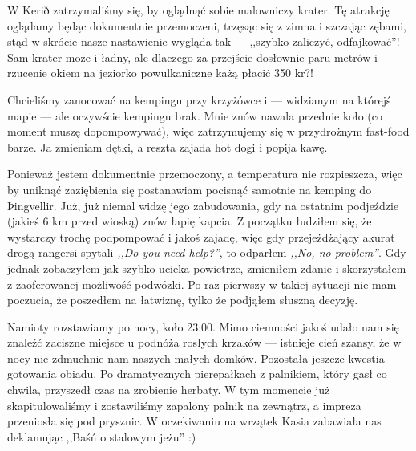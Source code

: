 
W Kerið zatrzymaliśmy się, by oglądnąć sobie malowniczy krater. Tę atrakcję oglądamy będąc dokumentnie przemoczeni, trzęsąc się z zimna i szczając zębami, stąd w skrócie nasze nastawienie wygląda tak --- ,,szybko zaliczyć, odfajkować''! Sam krater może i ładny, ale dlaczego za przejście dosłownie paru metrów i rzucenie okiem na jeziorko powulkaniczne każą płacić 350 kr?!

Chcieliśmy zanocować na kempingu przy krzyżówce  i  --- widzianym na którejś mapie --- ale oczywście kempingu brak. Mnie znów nawala przednie koło (co moment muszę dopompowywać), więc zatrzymujemy się w przydrożnym fast-food barze. Ja zmieniam dętki, a reszta zajada hot dogi i popija kawę.


Ponieważ jestem dokumentnie przemoczony, a temperatura nie rozpieszcza, więc by uniknąć zaziębienia się postanawiam pocisnąć samotnie na kemping do Þingvellir. Już, już niemal widzę jego zabudowania, gdy na ostatnim podjeździe (jakieś 6 km przed wioską) znów łapię kapcia. Z początku łudziłem się, że wystarczy trochę podpompować i jakoś zajadę, więc gdy przejeżdżający akurat drogą rangersi spytali \emph{,,Do you need help?''}, to odparłem \emph{,,No, no problem''}. Gdy jednak zobaczyłem jak szybko ucieka powietrze, zmieniłem zdanie i skorzystałem z zaoferowanej możliwość podwózki. Po raz pierwszy w takiej sytuacji nie mam poczucia, że poszedłem na łatwiznę, tylko że podjąłem słuszną decyzję.

Namioty rozstawiamy po nocy, koło 23:00. Mimo ciemności jakoś udało nam się znaleźć zaciszne miejsce u podnóża rosłych krzaków --- istnieje cień szansy, że w nocy nie zdmuchnie nam naszych małych domków. Pozostała jeszcze kwestia gotowania obiadu. Po dramatycznych pierepałkach z palnikiem, który gasł co chwila, przyszedł czas na zrobienie herbaty. W tym momencie już skapitulowaliśmy i zostawiliśmy zapalony palnik na zewnątrz, a impreza przeniosła się pod prysznic. W oczekiwaniu na wrzątek Kasia zabawiała nas deklamując ,,Baśń o stalowym jeżu'' :)

